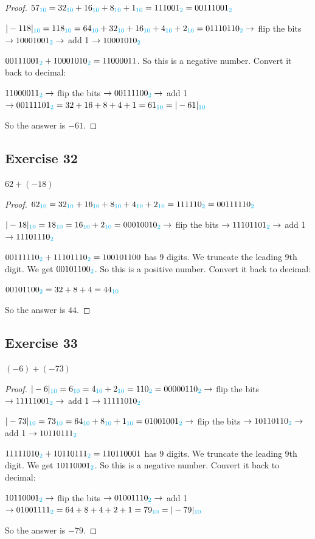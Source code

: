 \documentclass[14pt]{extarticle}
\newcommand{\base}[1]{{\color{cyan}#1}}
\begin{document}
\begin{proof}
$57_\base{10} = 32_\base{10} + 16_\base{10} + 8_\base{10} +
1_\base{10} = 111001_\base{2} = 00111001_\base{2}$

$|-118|_\base{10} = 118_\base{10} = 64_\base{10} + 32_\base{10} + 16_\base{10} + 4_\base{10} + 2_\base{10} = 01110110_\base{2} \to$ flip the bits $\to 10001001_\base{2} \to$ add 1 $\to 10001010_\base{2}$

$00111001_\base{2} + 10001010_\base{2} = 1100 0011$. So this is a negative number. Convert it back to decimal:

$11000011_\base{2} \to$ flip the bits $\to 00111100_\base{2} \to$ add 1 $\to 00111101_\base{2} = 32 + 16 + 8 + 4 + 1 = 61_\base{10} = |-61|_\base{10}$

So the answer is $-61$.
\end{proof}

\subsection{Exercise 32}
$62 + (-18)$

\begin{proof}
$62_\base{10} = 32_\base{10} + 16_\base{10} + 8_\base{10} + 4_\base{10} + 2_\base{10} = 111110_\base{2} = 00111110_\base{2}$

$|-18|_\base{10} = 18_\base{10} = 16_\base{10} + 2_\base{10} = 00010010_\base{2} \to$ flip the bits $\to 11101101_\base{2} \to$ add 1 $\to 11101110_\base{2}$

$00111110_\base{2} + 11101110_\base{2} = 1 0010 1100$ has 9 digits. We truncate the leading 9th digit. We get $00101100_\base{2}$. So this is a positive number. Convert it back to decimal:

$00101100_\base{2} = 32 + 8 + 4 = 44_\base{10}$

So the answer is $44$.
\end{proof}

\subsection{Exercise 33}
$(-6) + (-73)$

\begin{proof}
$|-6|_\base{10} = 6_\base{10} = 4_\base{10} + 2_\base{10} = 110_\base{2} = 00000110_\base{2} \to$ flip the bits $\to 11111001_\base{2} \to$ add 1 $\to 11111010_\base{2}$

$|-73|_\base{10} = 73_\base{10} = 64_\base{10} + 8_\base{10} + 1_\base{10} = 01001001_\base{2} \to$ flip the bits $\to 10110110_\base{2} \to$ add 1 $\to 10110111_\base{2}$

$11111010_\base{2} + 10110111_\base{2} = 1 1011 0001$ has 9 digits. We truncate the leading 9th digit. We get $10110001_\base{2}$. So this is a negative number. Convert it back to decimal:

$10110001_\base{2} \to$ flip the bits $\to 01001110_\base{2} \to$ add 1 $\to 01001111_\base{2} = 64 + 8 + 4 + 2 + 1 = 79_\base{10} = |-79|_\base{10}$

So the answer is $-79$.
\end{proof}
\end{document}
